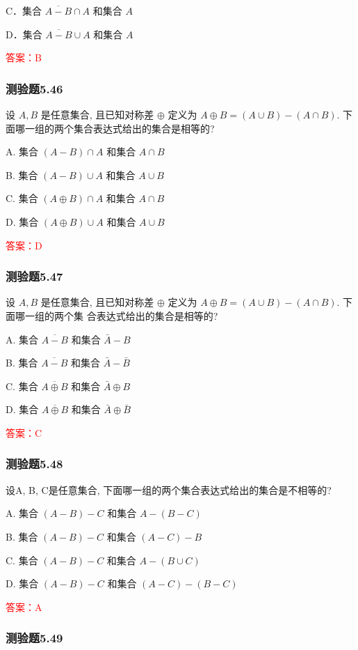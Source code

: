 \documentclass[UTF8, heading=true]{ctexart}
\begin{document}
C．集合 $\overline{A-B} \cap A$ 和集合 $A$

D．集合 $\overline{A-B} \cup A$ 和集合 $A$

\textcolor{red}{答案：B}

\subsubsection{测验题5.46}
设 $A, B$ 是任意集合, 且已知对称差 $\oplus$ 定义为 $A \oplus B=(A \cup B)-(A \cap B)$. 下面哪一组的两个集合表达式给出的集合是相等的?

A. 集合 $(A-B) \cap A$ 和集合 $A \cap B$

B. 集合 $(A-B) \cup A$ 和集合 $A \cup B$

C. 集合 $(A \oplus B) \cap A$ 和集合 $A \cap B$

D. 集合 $(A \oplus B) \cup A$ 和集合 $A \cup B$

\textcolor{red}{答案：D}


\subsubsection{测验题5.47}

设 $A, B$ 是任意集合, 且已知对称差 $\oplus$ 定义为 $A \oplus B=(A \cup B)-(A \cap B)$. 下面哪一组的两个集
合表达式给出的集合是相等的?

A. 集合 $\overline{A-B}$ 和集合 $\bar{A}-B$

B. 集合 $\overline{A-B}$ 和集合 $\bar{A}-\bar{B}$

C. 集合 $\overline{A \oplus B}$ 和集合 $\bar{A} \oplus B$

D. 集合 $\overline{A \oplus B}$ 和集合 $\bar{A} \oplus \bar{B}$

\textcolor{red}{答案：C}

\subsubsection{测验题5.48}
设A, B, C是任意集合, 下面哪一组的两个集合表达式给出的集合是不相等的?

A. 
集合 $(A-B)-C$ 和集合 $A-(B-C)$

B. 
集合 $(A-B)-C$ 和集合 $(A-C)-B$

C. 
集合 $(A-B)-C$ 和集合 $A-(B \cup C)$

D. 
集合 $(A-B)-C$ 和集合 $(A-C)-(B-C)$

\textcolor{red}{答案：A}

\subsubsection{测验题5.49}
\end{document}
